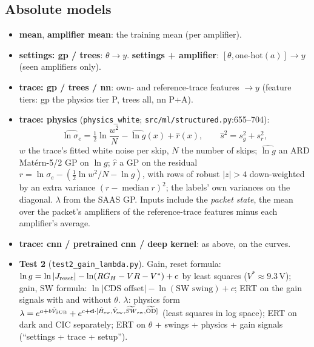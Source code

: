 \documentclass[10pt,a4paper]{article}
\newcommand{\code}[1]{\texttt{\small #1}}
\newcommand{\med}{\operatorname{median}}
\begin{document}
\subsection{Absolute models}
\begin{itemize}
\item \textbf{mean}, \textbf{amplifier mean}: the training mean (per amplifier).
\item \textbf{settings: gp / trees}: $\theta\to y$. \textbf{settings + amplifier}: $[\theta,\text{one-hot}(a)]\to y$ (seen amplifiers only).
\item \textbf{trace: gp / trees / nn}: own- and reference-trace features $\to y$ (feature tiers: gp the physics tier P, trees
  all, nn P+A).
\item \textbf{trace: physics} (\code{physics\_white}; \code{src/ml/structured.py}:655--704):
\begin{equation}
\widehat{\ln\sigma_e}=\tfrac12\ln\frac{w^2}{N}-\widehat{\ln g}(x)+\hat r(x),\qquad \hat s^2=s_g^2+s_r^2,
\end{equation}
$w$ the trace's fitted white noise per skip, $N$ the number of skips; $\widehat{\ln g}$ an ARD Matérn-5/2 GP on $\ln g$;
$\hat r$ a GP on the residual $r=\ln\sigma_e-(\tfrac12\ln w^2/N-\ln g)$, with rows of robust $|z|>4$ down-weighted by an
extra variance $(r-\med r)^2$; the labels' own variances on the diagonal. $\lambda$ from the SAAS GP. Inputs include the
\emph{packet state}, the mean over the packet's amplifiers of the reference-trace features minus each amplifier's average.
\item \textbf{trace: cnn / pretrained cnn / deep kernel}: as above, on the curves.
\item \textbf{Test 2} (\code{test2\_gain\_lambda.py}). Gain, reset formula: $\ln g=\ln|J_{\rm reset}|-\ln(RG_H-VR-V^*)+c$ by least squares
  ($V^*\approx9.3$\,V); gain, SW formula: $\ln|\text{CDS offset}|-\ln(\text{SW swing})+c$; ERT on the gain signals with and
  without $\theta$. $\lambda$: physics form $\lambda=e^{a+b\tilde V_{\rm SUB}}+e^{c+\mathbf d\cdot[\tilde H_{\rm sw},\tilde V_{\rm sw},\widetilde{SW}_{\rm sw},\widetilde{\rm OD}]}$
  (least squares in log space); ERT on dark and CIC separately; ERT on $\theta$ + swings + physics + gain signals (``settings + trace + setup'').
\end{itemize}
\end{document}
